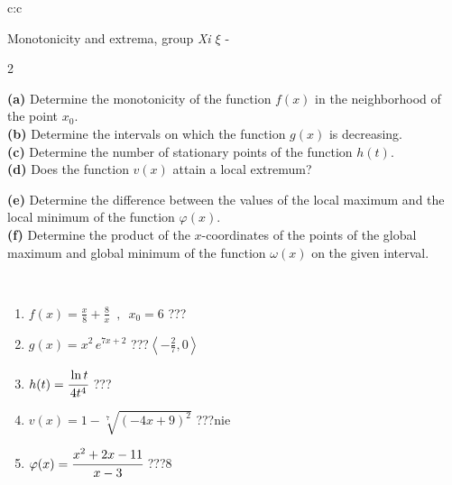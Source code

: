 \documentclass[10pt]{report}
\begin{document}
\begin{tabular}{c:c}
\begin{minipage}[c][104.5mm][t]{0.5\linewidth}
\begin{center}
\vspace{5mm}
{\huge Monotonicity and extrema, group \textit{Xi $\xi$} -}\\[5mm]
\begin{minipage}{0.95\linewidth}
\begin{center}
{\small \begin{multicols}{2} \raggedright
\textbf{(a)} Determine the monotonicity of the function \(f(x)\) in the neighborhood of the point \(x_0\). \\[1mm]
\textbf{(b)} Determine the intervals on which the function \(g(x)\) is decreasing. \\[1mm]
\textbf{(c)} Determine the number of stationary points of the function \(h(t)\). \\[1mm]
\textbf{(d)} Does the function \(v(x)\) attain a local extremum? \par \columnbreak
\textbf{(e)} Determine the difference between the values of the local maximum and the local minimum of the function \(\varphi(x)\). \\[1mm]
\textbf{(f)} Determine the product of the \(x\)-coordinates of the points of the global maximum and global minimum of the function \(\omega(x)\) on the given interval. \\[1mm]
\end{multicols}
}
\end{center}
\end{minipage}
\\[1mm]
\begin{minipage}{0.79\linewidth}
\begin{center}
\begin{varwidth}{\linewidth}
\setlength{\itemsep}{0pt}
\begin{enumerate}
\normalsize
\item $f(x)=\frac{x}{8}+\frac{8}{x} \enspace , \enspace x_0=6$\quad \dotfill\; ???\;\dotfill \quad {}
\item $g(x)=x^2\, e^{7x+2}$\quad \dotfill\; ???\;\dotfill \quad $\left\langle-\frac{2}{7} , 0\right\rangle$
\item $h(t)=\cfrac{\ln t}{4t^4}$\quad \dotfill\; ???\;\dotfill {}
\item $v(x)=1-\sqrt[7]{(-4x+9)^2}$\quad \dotfill\; ???\;\dotfill \quad $\text{nie}$
\item $\varphi(x)=\cfrac{x^2+2x-11}{x-3}$\quad \dotfill\; ???\;\dotfill \quad $8$

\end{enumerate}
\end{varwidth}
\end{center}
\end{minipage}
\end{center}
\end{minipage}
\end{tabular}
\end{document}
